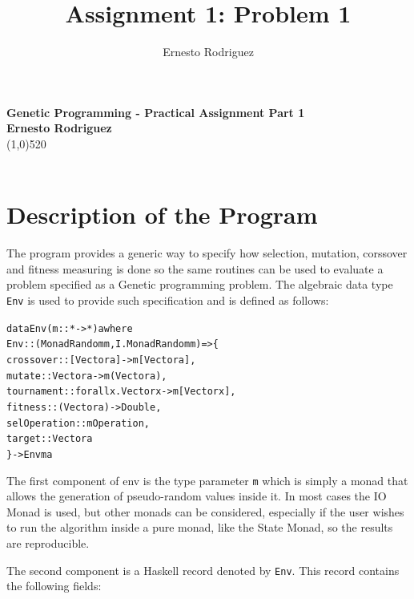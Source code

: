 \documentclass[10pt]{article}
\title{Assignment 1: Problem 1}
\author{Ernesto Rodriguez}
\begin{document}
\Huge{\bf Genetic Programming - Practical Assignment Part 1\\[1cm]}
\large{\bf Ernesto Rodriguez\\[0.5cm]}
\line(1,0){520}\\ \\

\section{Description of the Program}

The program provides a generic way to specify how selection, mutation, corssover and fitness measuring is done so the same routines can be used to evaluate a problem specified as a Genetic programming problem. The algebraic data type \verb+Env+ is used to provide such specification and is defined as follows:

\begin{alltt}

data Env (m :: * -> *) a where
  Env :: (MonadRandom m, I.MonadRandom m) => \{
    crossover :: [Vector a] -> m [Vector a],
    mutate :: Vector a -> m (Vector a),
    tournament :: forall x . Vector x -> m [Vector x],
    fitness :: (Vector a) -> Double,
    selOperation :: m Operation,
    target :: Vector a                 
  \} -> Env m a

\end{alltt}

The first component of env is the type parameter \verb+m+ which is simply a monad that allows the generation of pseudo-random values inside it. In most cases the IO Monad is used, but other monads can be considered, especially if the user wishes to run the algorithm inside a pure monad, like the State Monad, so the results are reproducible. 

The second component is a Haskell record denoted by \verb+Env+. This record contains the following fields:
\end{document}
